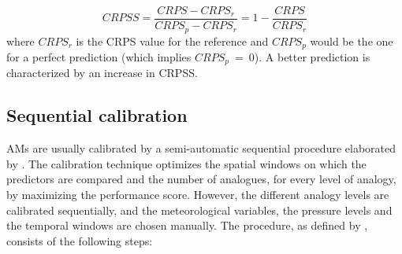 \documentclass[review]{elsarticle}
\begin{document}
\begin{equation}
\label{eq:CRPSS}
CRPSS = \frac{CRPS-CRPS_{r}}{CRPS_{p}-CRPS_{r}} = 1-\frac{CRPS}{CRPS_{r}}
\end{equation}
where $CRPS_{r}$ is the CRPS value for the reference and $CRPS_{p}$ would be the one for a perfect prediction (which implies $CRPS_{p}~=~0$). A better prediction is characterized by an increase in CRPSS.


\subsection{Sequential calibration}
\label{sec:sequential}

AMs are usually calibrated by a semi-automatic sequential procedure elaborated by \citet{Bontron2004} \cite[see also ][]{Radanovics2013, BenDaoud2016}. The calibration technique optimizes the spatial windows on which the predictors are compared and the number of analogues, for every level of analogy, by maximizing the performance score. However, the different analogy levels are calibrated sequentially, and the meteorological variables, the pressure levels and the temporal windows are chosen manually. The procedure, as defined by \citet{Bontron2004}, consists of the following steps:
\end{document}
